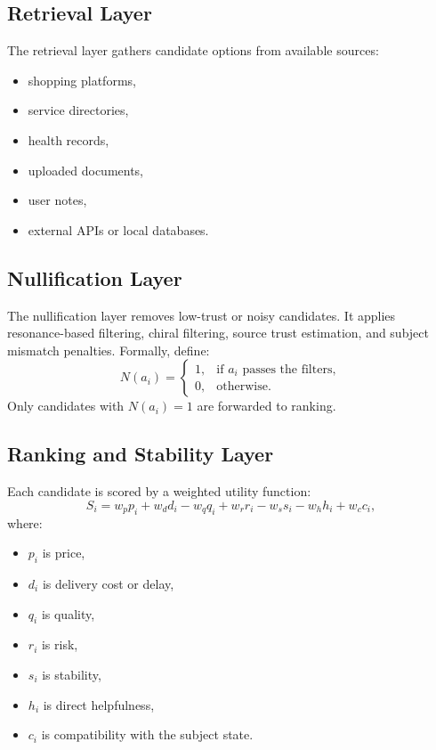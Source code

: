 \documentclass[11pt,a4paper]{article}
\begin{document}
\subsection{Retrieval Layer}
The retrieval layer gathers candidate options from available sources:
\begin{itemize}[leftmargin=1.2em]
    \item shopping platforms,
    \item service directories,
    \item health records,
    \item uploaded documents,
    \item user notes,
    \item external APIs or local databases.
\end{itemize}

\subsection{Nullification Layer}
The nullification layer removes low-trust or noisy candidates. It applies resonance-based filtering, chiral filtering, source trust estimation, and subject mismatch penalties. Formally, define:
\[
N(a_i) =
\begin{cases}
1, & \text{if } a_i \text{ passes the filters}, \\
0, & \text{otherwise}.
\end{cases}
\]
Only candidates with $N(a_i)=1$ are forwarded to ranking.

\subsection{Ranking and Stability Layer}
Each candidate is scored by a weighted utility function:
\[
S_i = w_p p_i + w_d d_i - w_q q_i + w_r r_i - w_s s_i - w_h h_i + w_c c_i,
\]
where:
\begin{itemize}[leftmargin=1.2em]
    \item $p_i$ is price,
    \item $d_i$ is delivery cost or delay,
    \item $q_i$ is quality,
    \item $r_i$ is risk,
    \item $s_i$ is stability,
    \item $h_i$ is direct helpfulness,
    \item $c_i$ is compatibility with the subject state.
\end{itemize}
\end{document}
